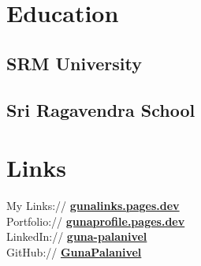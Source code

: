\documentclass[]{deedy-resume-openfont}
\begin{document}
\begin{minipage}[t]{0.33\textwidth} 


\section{Education} 

\subsection{SRM University}



\sectionsep

\subsection{Sri Ragavendra School}



\vspace{\topsep}


\sectionsep


\section{Links} 

My Links://  \href{https://gunalinks.pages.dev/}{\bf gunalinks.pages.dev} \\

Portfolio://  \href{https://gunaprofile.pages.dev/}{\bf gunaprofile.pages.dev} \\

LinkedIn://  \href{https://www.linkedin.com/in/guna-palanivel}{\bf guna-palanivel} \\

GitHub://  \href{https://github.com/GunaPalanivel}{\bf GunaPalanivel} \\


\end{minipage}
\end{document}
